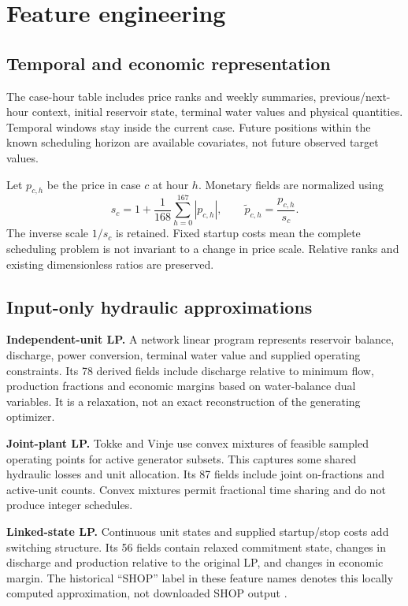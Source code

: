 \documentclass[a4paper,11pt]{article}
\begin{document}
\section{Feature engineering}\label{features}
\subsection*{Temporal and economic representation}
The case-hour table includes price ranks and weekly summaries, previous/next-hour context, initial reservoir state, terminal water values and physical quantities. Temporal windows stay inside the current case. Future positions within the known scheduling horizon are available covariates, not future observed target values.

Let $p_{c,h}$ be the price in case $c$ at hour $h$. Monetary fields are normalized using
\[
 s_c=1+\frac{1}{168}\sum_{h=0}^{167}|p_{c,h}|,
 \qquad \widetilde p_{c,h}=\frac{p_{c,h}}{s_c}.
\]
The inverse scale $1/s_c$ is retained. Fixed startup costs mean the complete scheduling problem is not invariant to a change in price scale. Relative ranks and existing dimensionless ratios are preserved.

\subsection*{Input-only hydraulic approximations}
\textbf{Independent-unit LP.} A network linear program represents reservoir balance, discharge, power conversion, terminal water value and supplied operating constraints. Its 78 derived fields include discharge relative to minimum flow, production fractions and economic margins based on water-balance dual variables. It is a relaxation, not an exact reconstruction of the generating optimizer.

\textbf{Joint-plant LP.} Tokke and Vinje use convex mixtures of feasible sampled operating points for active generator subsets. This captures some shared hydraulic losses and unit allocation. Its 87 fields include joint on-fractions and active-unit counts. Convex mixtures permit fractional time sharing and do not produce integer schedules.

\textbf{Linked-state LP.} Continuous unit states and supplied startup/stop costs add switching structure. Its 56 fields contain relaxed commitment state, changes in discharge and production relative to the original LP, and changes in economic margin. The historical ``SHOP'' label in these feature names denotes this locally computed approximation, not downloaded SHOP output \cite{source,physics}.
\end{document}
